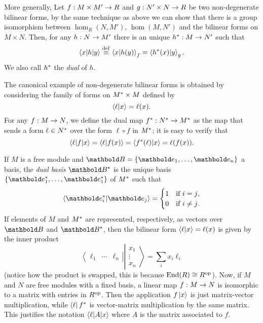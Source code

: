 More generally, Let $f:M\times M'\rightarrow R$ and $g:N'\times N\rightarrow R$ be two
non-degenerate bilinear forms, by the same technique as above we can
show that there is a group isomorphism between $\hom_R(N,M')$,
$\hom(M,N')$ and the bilinear forms on $M\times N$. Then, for any
$h:N\rightarrow M'$ there is an unique $h^\ast:M\rightarrow N'$ such that
\[\left\langle x \middle| h \middle| y \right\rangle\overset{\mathrm{def}}{\equiv}\left\langle x \middle| h(y) \right\rangle_f = \left\langle h^\ast(x) \middle| y \right\rangle_g 
\text{.}\]
We also call $h^\ast$ the \textit{dual} of $h$.

The canonical example of non-degenerate bilinear forms is obtained by
considering the family of forms on $M^\ast\times M$ defined by
\[\left\langle \ell \middle| x \right\rangle = \ell(x) \text{.}\]
For any $f:M\rightarrow N$, we define the dual map
$f^\ast:N^\ast\rightarrow M^\ast$ as the map that sends a form
$\ell\in N^\ast$ over the form $\ell\circ f$ in $M^\ast$; it is
easy to verify that
\[\left\langle \ell \middle| f \middle| x \right\rangle =  \left\langle \ell \middle| f(x) \right\rangle = \left\langle f^\ast(\ell) \middle| x \right\rangle
= \ell(f(x))\text{.}\]


  If $M$ is a free module and
$\basis{B}=\{\basis{e}_1,\ldots,\basis{e}_n\}$ a basis, the
\textit{dual basis} $\dual{\basis{B}}$ is the unique
basis $\{\dual{\basis{e}_1},\ldots,\dual{\basis{e}_1}\}$ of $M^\ast$
such that
\begin{equation*}
  \braket{\dual{\basis{e}_i}}{\basis{e}_j} =
  \begin{cases}
    1 &\text{if $i=j$,}\\
    0 &\text{if $i\ne j$.}
  \end{cases}
\end{equation*}
If elements of $M$ and $M^\ast$ are represented, respectively, as
vectors over $\basis{B}$ and $\dual{\basis{B}}$, then the bilinear
form $\left\langle \ell \middle| x \right\rangle=\ell(x)$ is given by the inner product
\begin{equation*}
  \left\langle\begin{matrix}
      \ell_1 &\cdots & \ell_n
    \end{matrix}\right\rvert
  \left\lvert\begin{matrix}
    x_1\\
    \vdots\\
    x_n
  \end{matrix}\right\rangle
  =
  \sum_i x_i\ell_i
\end{equation*}
(notice how the product is swapped, this is because $\operatorname{End}(R)\cong
R^{\mathrm{op}}$).  Now, if $M$ and $N$ are free modules with a fixed basis, a
linear map $f:M\rightarrow N$ is isomorphic to a matrix with entries in
$R^{\mathrm{op}}$. Then the application $f\left\lvert x \right\rangle$ is just matrix-vector
multiplication, while $\left\langle \ell \right\rvert f^\ast$ is vector-matrix
multiplication by the same matrix. This justifies the notation
$\left\langle \ell \middle| A \middle| x \right\rangle$ where $A$ is the matrix associated to $f$.


